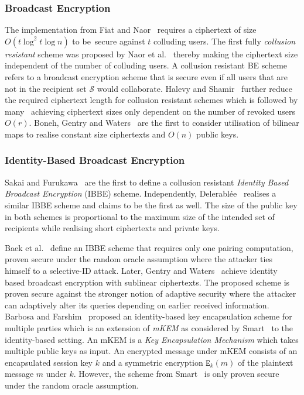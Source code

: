 \subsubsection{Broadcast Encryption}
The implementation from Fiat and Naor~\cite{art:FiatN93} requires a ciphertext of size  $O \left( t \log^2 t \log n \right)$ to be~secure against $t$ colluding users. The first fully \textit{collusion resistant} scheme was proposed by Naor et al.~\cite{art:NaorNL01} thereby making the ciphertext size independent of the number of colluding users. A collusion resistant BE scheme refers to a broadcast encryption scheme that is secure even if all users that are not in the recipient set $\mathcal{S}$ would collaborate. Halevy and Shamir~\cite{art:HalevyS02} further reduce the required ciphertext length for collusion resistant schemes which is followed by many~\cite{art:DodisF02,art:GoodrichST04,art:LewkoSW08} achieving ciphertext sizes only dependent on the number of revoked users $O \left( r \right)$. Boneh, Gentry and Waters~\cite{art:BonehBG05} are the first to consider utilisation of bilinear maps to realise constant size ciphertexts and $O \left( n \right)$ public keys.

\subsubsection{Identity-Based Broadcast Encryption}
Sakai and Furukawa~\cite{art:SakaiF07} are the first to define a collusion resistant \textit{Identity Based Broadcast Encryption} (IBBE) scheme. Independently, Delerabl\'{e}e~\cite{art:Delerablee07} realises a similar IBBE scheme and claims to be the first as well.  The size of the public key in both schemes is proportional to the maximum size of the intended set of recipients while realising short ciphertexts and private keys. 

Baek et al.~\cite{art:BaekNSS04} define an IBBE scheme that requires only one pairing computation, proven secure under the random oracle assumption where the attacker ties himself to a selective-ID attack. Later, Gentry and Waters~\cite{art:GentryW08} achieve identity based broadcast encryption with sublinear ciphertexts. The proposed scheme is proven secure against the stronger notion of adaptive security where the attacker can adaptively alter its queries depending on earlier received information. Barbosa and Farshim~\cite{art:BarbosaF05} proposed an identity-based key encapsulation scheme for multiple parties which is an extension of \textit{mKEM} as considered by Smart~\cite{art:Smart04} to the identity-based setting. An mKEM is a \textit{Key Encapsulation Mechanism} which takes multiple public keys as input. An encrypted message under mKEM consists of an encapsulated session key $k$ and a symmetric encryption $\mathtt{E}_k \left( m \right)$ of the plaintext message $m$ under $k$. However, the scheme from Smart~\cite{art:Smart04} is only proven secure under the random oracle assumption.

